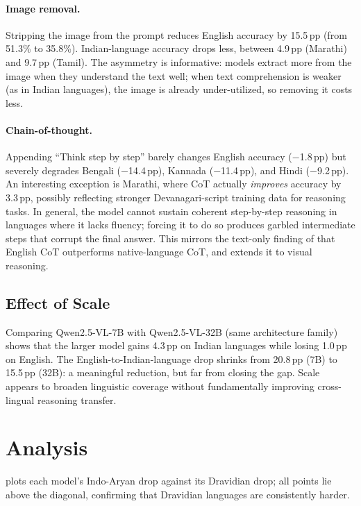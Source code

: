 \documentclass[11pt,a4paper]{article}
\newcommand{\pp}{\,\text{pp}}
\begin{document}
\paragraph{Image removal.}
Stripping the image from the prompt reduces English accuracy by 15.5$\pp$ (from 51.3\% to 35.8\%).
Indian-language accuracy drops less, between 4.9$\pp$ (Marathi) and 9.7$\pp$ (Tamil).
The asymmetry is informative: models extract more from the image when they understand the text well; when text comprehension is weaker (as in Indian languages), the image is already under-utilized, so removing it costs less.

\paragraph{Chain-of-thought.}
Appending ``Think step by step'' barely changes English accuracy ($-$1.8$\pp$) but severely degrades Bengali ($-$14.4$\pp$), Kannada ($-$11.4$\pp$), and Hindi ($-$9.2$\pp$).
An interesting exception is Marathi, where CoT actually \emph{improves} accuracy by 3.3$\pp$, possibly reflecting stronger Devanagari-script training data for reasoning tasks.
In general, the model cannot sustain coherent step-by-step reasoning in languages where it lacks fluency; forcing it to do so produces garbled intermediate steps that corrupt the final answer.
This mirrors the text-only finding of \citet{shi2023mgsm} that English CoT outperforms native-language CoT, and extends it to visual reasoning.


\subsection{Effect of Scale}

Comparing Qwen2.5-VL-7B with Qwen2.5-VL-32B (same architecture family) shows that the larger model gains 4.3$\pp$ on Indian languages while losing 1.0$\pp$ on English.
The English-to-Indian-language drop shrinks from 20.8$\pp$ (7B) to 15.5$\pp$ (32B): a meaningful reduction, but far from closing the gap.
Scale appears to broaden linguistic coverage without fundamentally improving cross-lingual reasoning transfer.


\section{Analysis}
\label{sec:analysis}

 plots each model's Indo-Aryan drop against its Dravidian drop; all points lie above the diagonal, confirming that Dravidian languages are consistently harder.
\end{document}

